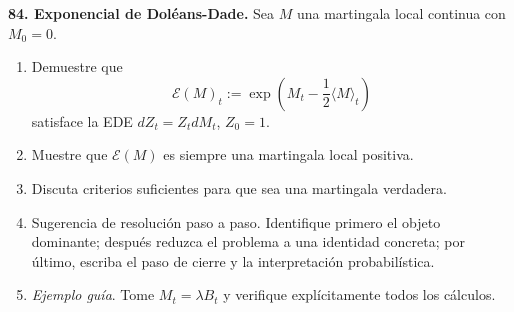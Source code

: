 \documentclass[11pt, letterpaper]{article}
\begin{document}
\begin{ejercicio}
    \textbf{84. Exponencial de Doléans-Dade.} Sea $M$ una martingala local continua con $M_0=0$.
    \begin{enumerate}
        \item Demuestre que
        \[ \mathcal{E}(M)_t := \exp\left(M_t - \frac{1}{2}\langle M \rangle_t\right) \]
        satisface la EDE $dZ_t = Z_t dM_t$, $Z_0 = 1$.
        \item Muestre que $\mathcal{E}(M)$ es siempre una martingala local positiva.
        \item Discuta criterios suficientes para que sea una martingala verdadera.
        \item Sugerencia de resolución paso a paso. Identifique primero el objeto dominante; después reduzca el problema a una identidad concreta; por último, escriba el paso de cierre y la interpretación probabilística.
        \item \textit{Ejemplo guía}. Tome $M_t = \lambda B_t$ y verifique explícitamente todos los cálculos.
    \end{enumerate}
\end{ejercicio}

\vspace{5mm}
\end{document}
